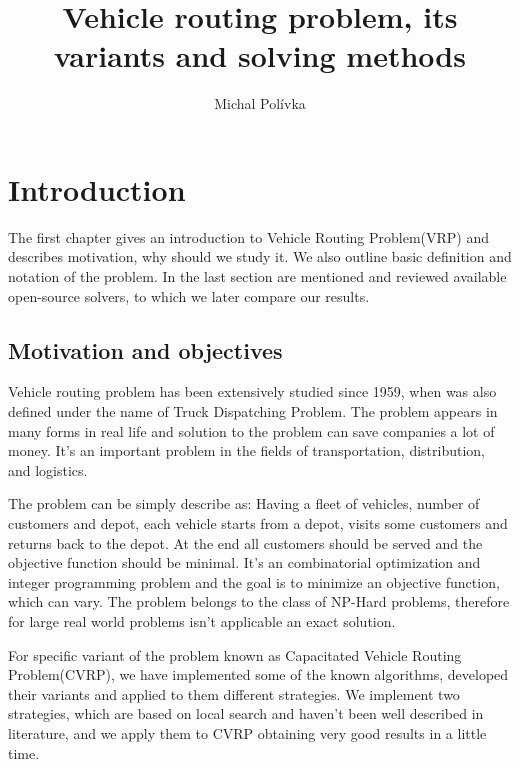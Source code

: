 \documentclass[thesis=B,english]{FITthesis}[2012/10/20]
\title{Vehicle routing problem, its variants and solving methods}
\author{Michal Polívka} %
\begin{document}
\chapter{Introduction}
    The first chapter gives an introduction to Vehicle Routing Problem(VRP) and describes motivation, why should we study it. We also outline basic definition and notation of the problem. In the last section are mentioned and reviewed available open-source solvers, to which we later compare our results.

    \section{Motivation and objectives}
    Vehicle routing problem has been extensively studied since 1959\cite{1}, when was also defined under the name of Truck Dispatching Problem. The problem appears in many forms in real life and solution to the problem can save companies a lot of money. It's an important problem in the fields of transportation, distribution, and logistics.

    The problem can be simply describe as: Having a fleet of vehicles, number of customers and depot, each vehicle starts from a depot, visits some customers and returns back to the depot. At the end all customers should be served and the objective function should be minimal. It's an combinatorial optimization and integer programming problem and the goal is to minimize an objective function, which can vary.
    The problem belongs to the class of NP-Hard problems, therefore for large real world problems isn't applicable an exact solution.

    For specific variant of the problem known as Capacitated Vehicle Routing Problem(CVRP), we have implemented some of the known algorithms, developed their variants and applied to them different strategies.
    We implement two strategies, which are based on local search and haven't been well described in literature, and we apply them to CVRP obtaining very good results in a little time.
\end{document}
